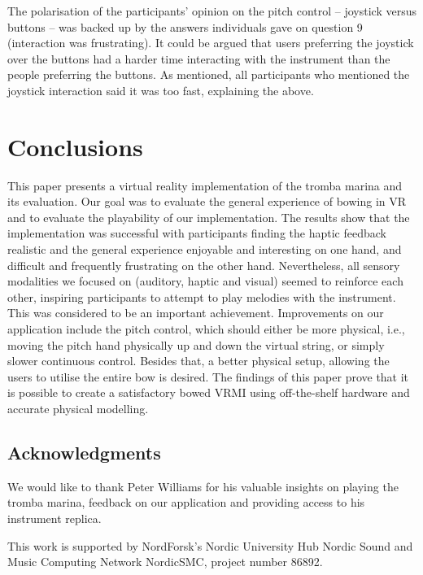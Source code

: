 The polarisation of the participants' opinion on the pitch control -- joystick versus buttons -- was backed up by the answers individuals gave on question 9 (interaction was frustrating). It could be argued that users preferring the joystick over the buttons had a harder time interacting with the instrument than the people preferring the buttons. As mentioned, all participants who mentioned the joystick interaction said it was too fast, explaining the above.

\section{Conclusions} \label{sec:conclusion}
This paper presents a virtual reality implementation of the tromba marina and its evaluation. Our goal was to evaluate the general experience of bowing in VR and to evaluate the playability of our implementation. The results show that the implementation was successful with participants finding the haptic feedback realistic and the general experience enjoyable and interesting on one hand, and difficult and frequently frustrating on the other hand. Nevertheless, all sensory modalities we focused on (auditory, haptic and visual) seemed to reinforce each other, inspiring participants to attempt to play melodies with the instrument. This was considered to be an important achievement.
Improvements on our application include the pitch control, which  should either be more physical, i.e., moving the pitch hand physically up and down the virtual string, or simply slower continuous control. Besides that, a better physical setup, allowing the users to utilise the entire bow is desired.
The findings of this paper prove that it is possible to create a satisfactory bowed VRMI using off-the-shelf hardware and accurate physical modelling. 

\subsection*{Acknowledgments}
We would like to thank Peter Williams for his valuable insights on playing the tromba marina, feedback on our application and providing access to his instrument replica. 

This work is supported by NordForsk's Nordic
University Hub Nordic Sound and Music Computing Network
NordicSMC, project number 86892.
